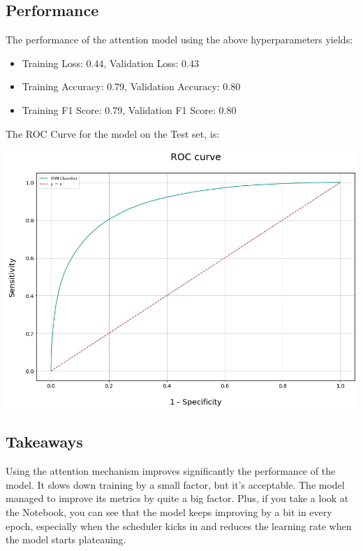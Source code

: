 \documentclass[12pt]{report}
\begin{document}
\subsection*{Performance}
The performance of the attention model using the above hyperparameters yields:
\begin{itemize}
    \item Training Loss: 0.44, Validation Loss: 0.43
    \item Training Accuracy: 0.79, Validation Accuracy: 0.80
    \item Training F1 Score: 0.79, Validation F1 Score: 0.80
\end{itemize}
\bigskip

\noindent The ROC Curve for the model on the Test set, is:
\bigskip
\bigskip

\hspace*{-2.0cm}
\includegraphics[scale=0.45]{roc2.png}
\clearpage


\subsection*{Takeaways}
Using the attention mechanism improves significantly the performance of the model. It slows
down training by a small factor, but it's acceptable. The model managed to improve its
metrics by quite a big factor. Plus, if you take a look at the Notebook, you can see that
the model keeps improving by a bit in every epoch, especially when the scheduler kicks in
and reduces the learning rate when the model starts plateauing. \bigskip
\end{document}
